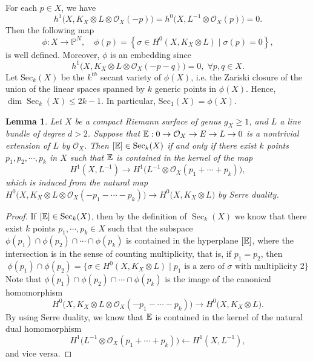 \documentclass[12pt]{article}
\newtheorem{lem}{Lemma}[section]
\begin{document}
For each $p \in X$, we have
\[ h^{1} \big(X, K_{X} \otimes L \otimes \mathcal{O}_{X}(-p)\big) = h^{0}\big(X, L^{-1} \otimes \mathcal{O}_{X}(p)\big) = 0. \]
Then the following map
\[ \phi \colon X \rightarrow \mathbb{P}^{N}, \quad \phi(p) = \left\{ \sigma \in H^{0}(X, K_{X} \otimes L) \mid \sigma(p) = 0\right\}, \]
is well defined. Moreover, $\phi$ is an embedding since
\[ h^{1}\big(X, K_{X} \otimes L \otimes \mathcal{O}_{X}(-p - q)\big) = 0,\; \forall p,q \in X. \]
Let Sec$_{k}(X)$ be the $k^{th}$ secant variety of $\phi(X)$,  i.e. the Zariski closure of the union of the linear spaces spanned by $k$ generic points in $\phi(X)$. Hence, $\dim \operatorname{Sec}_{k}(X) \leq 2k - 1$. In particular, Sec$_{1}(X) = \phi(X)$.

\begin{lem}
\label{lem:secant}
Let $X$ be a compact Riemann surface of genus $g_{X} \geq 1$, and $L$ a line bundle of degree $d > 2$. Suppose that
${\Bbb E}:  0 \rightarrow \mathcal O_{X} \rightarrow E \rightarrow L \rightarrow 0$
is a nontrivial extension of $L$ by $\mathcal O_{X}$. Then $[{\Bbb E}] \in \operatorname{Sec}_{k}(X)$ if and only if there exist $k$ points $p_{1}, p_{2}, \cdots, p_{k}$ in $X$ such that ${\Bbb E}$ is contained in the kernel of the map
\[ H^{1}(X, L^{-1}) \rightarrow H^{1}\big(L^{-1} \otimes \mathcal{O}_{X}(p_{1} + \cdots + p_{k})\big), \]
which is induced from the natural map $ H^{0}\big(X, K_{X} \otimes L \otimes \mathcal{O}_{X}(-p_{1} - \cdots -p_{k}) \big) \rightarrow H^{0}\big(X, K_{X}\otimes L \big)$ by Serre duality.
\end{lem}
\begin{proof}
If $[{\Bbb E}] \in \operatorname{Sec}_{k}(X)$, then by the definition of $\operatorname{Sec}_{k}(X)$ we know that there exist $k$ points $p_{1}, \cdots, p_{k} \in X$ such that the subspace $\phi(p_{1}) \cap \phi(p_{2}) \cap \cdots \cap \phi(p_{k})$ is contained in the hyperplane $[{\Bbb E}]$, where the intersection is in the sense of counting multiplicity, that is, if $p_{1} = p_{2}$, then
\[ \phi(p_{1}) \cap \phi(p_{2}) = \{ \sigma \in H^{0}(X, K_{X} \otimes L) \mid \text{$p_{1}$ is a zero of $\sigma$ with multiplicity $2$} \}\]
Note that $\phi(p_{1}) \cap \phi(p_{2}) \cap \cdots \cap \phi(p_{k})$ is the image of the canonical homomorphism
\[ H^{0}\big(X, K_{X} \otimes L \otimes \mathcal{O}_{X}(-p_{1} - \cdots -p_{k}) \big) \rightarrow H^{0}\big(X, K_{X}\otimes L \big). \]
By using Serre duality, we know that ${\Bbb E}$ is contained in the kernel of the natural dual homomorphism
\[ H^{1}\big(L^{-1} \otimes \mathcal{O}_{X}(p_{1} + \cdots + p_{k})\big) \leftarrow H^{1}(X, L^{-1}), \]
and vice versa.
\end{proof}
\end{document}
